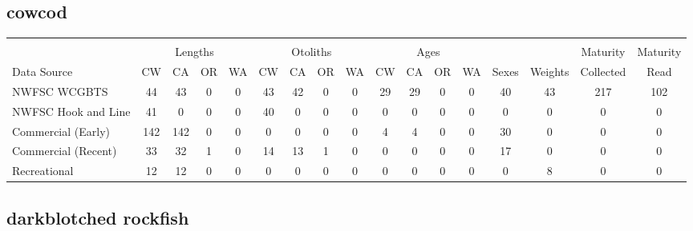 \documentclass[12pt,]{article}
\begin{document}
\FloatBarrier  

\subsection{cowcod}\label{cowcod}

\begin{table}[ht]
\centering
\begingroup\fontsize{10pt}{10pt}\selectfont
\begin{tabular}{|l|cccc|cccc|cccc|c|c|c|c|}
  \hline
 &  &  &  &  &  &  &  &  &  &  &  &  &  &  &  &  \\ 
   & \multicolumn{4}{c}{Lengths} &  \multicolumn{4}{c}{Otoliths} & \multicolumn{4}{c}{Ages} &  & & Maturity & Maturity\\
 Data Source & CW & CA & OR & WA & CW & CA & OR & WA & CW & CA & OR & WA & Sexes & Weights & Collected & Read\\
 \hline
NWFSC WCGBTS & 44 & 43 & 0 & 0 & 43 & 42 & 0 & 0 & 29 & 29 & 0 & 0 & 40 & 43 & 217 & 102 \\ 
  NWFSC Hook and Line & 41 & 0 & 0 & 0 & 40 & 0 & 0 & 0 & 0 & 0 & 0 & 0 & 0 & 0 & 0 & 0 \\ 
  Commercial (Early) & 142 & 142 & 0 & 0 & 0 & 0 & 0 & 0 & 4 & 4 & 0 & 0 & 30 & 0 & 0 & 0 \\ 
  Commercial (Recent) & 33 & 32 & 1 & 0 & 14 & 13 & 1 & 0 & 0 & 0 & 0 & 0 & 17 & 0 & 0 & 0 \\ 
  Recreational & 12 & 12 & 0 & 0 & 0 & 0 & 0 & 0 & 0 & 0 & 0 & 0 & 0 & 8 & 0 & 0 \\ 
   \hline
\end{tabular}
\endgroup
\end{table}

\FloatBarrier  

\subsection{darkblotched rockfish}\label{darkblotched-rockfish}
\end{document}
